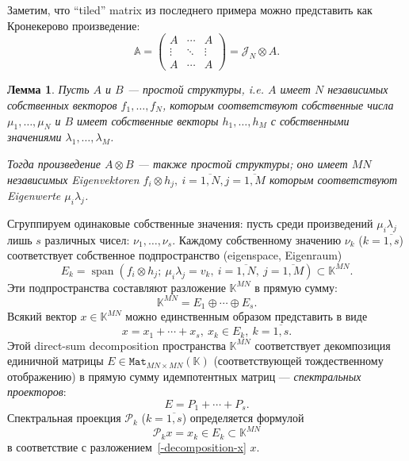 \documentclass[14pt,a4paper]{extarticle}
\numberwithin{equation}{section}
\newtheorem{lem}{Лемма}
\theoremstyle{definition}
\begin{document}
Заметим, что ``tiled'' matrix из последнего примера
можно представить как Кронекерово произведение:
\[
    \mathbb{A} =
    \begin{pmatrix}
    A & \cdots & A\\
    \vdots & \ddots & \vdots \\
    A & \cdots & A\end{pmatrix} =
        \mathcal{J}_N\otimes A.
    \]

\begin{lem}
Пусть \( A \) и \( B \) --- простой структуры,
    i.e. \( A \) имеет \( N \) независимых собственных векторов
    \( f_1, \ldots, f_N \),
    которым соответствуют собственные числа \( \mu_1, \ldots, \mu_N \)
    и \( B \) имеет собственные векторы \( h_1, \ldots, h_M \)
    с собственными значениями \( \lambda_1, \ldots, \lambda_M \).

Тогда произведение \( A\otimes B \) --- также простой структуры;
    оно имеет \( MN \) независимых Eigenvektoren \( f_i\otimes h_j,\ i{=}\overline{1,N}, j{=}\overline{1,M} \)
    которым соответствуют Eigenwerte \( \mu_i \lambda_j \).
\end{lem}


Сгруппируем одинаковые собственные значения: пусть среди произведений \( \mu_i
\lambda_j \) лишь \( s \) различных чисел: \( \nu_1, \ldots, \nu_s \).
Каждому собственному значению \( \nu_k \) (\( k{=}\overline{1,s} \)) соответствует
собственное подпространство (eigenspace, Eigenraum)
\[ E_k = \operatorname{span}(f_i\otimes h_j;\ \mu_i\lambda_j = v_k,\ i{=}\overline{1,N},\ j{=}\overline{1,M}) \subset \mathbb{K}^{MN}. \]
Эти подпространства составляют разложение \( \mathbb{K}^{MN} \) в прямую сумму:
    \[ \mathbb{K}^{MN} = E_1 \oplus \cdots \oplus E_s. \]
Всякий вектор \( x\in\mathbb{K}^{MN} \) можно единственным образом представить в виде
    \begin{equation}\label{-decomposition-x}
        x = x_1 + \cdots + x_s,\ x_k\in E_k,\ k=\overline{1,s}.
    \end{equation}
Этой direct-sum decomposition пространства \( \mathbb{K}^{MN} \)
    соответствует декомпозиция единичной матрицы \( E\in \mathtt{Mat}_{MN{\times}MN}(\mathbb{K}) \)
    (соответствующей тождественному отображению)
    в прямую сумму идемпотентных матриц --- \emph{спектральных проекторов}:
    \[
        E = P_1 + \cdots + P_s.
    \]
Спектральная проекция \( \mathcal{P}_k \) (\(k{=}\overline{1,s}\)) определяется формулой
    \[
        \mathcal{P}_k x = x_k \in E_k\subset \mathbb{K}^{MN}
    \]
    в соответствие с разложением~\eqref{-decomposition-x} \( x \).
\end{document}

